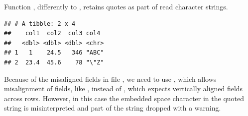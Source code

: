 \documentclass[krantz2]{krantz}\usepackage{knitr}
\begin{document}
Function , differently to , retains quotes as part of read character strings.

\begin{knitrout}\footnotesize
{}\color{fgcolor}\begin{kframe}
\begin{alltt}
\hlstd{(} \hlstd{=} \hlstd{)}
\end{alltt}


{\ttfamily\noindent\itshape\color{messagecolor}{\#\# \\\#\# -- Column specification --------------------------------------------------------\\\#\# cols(\\\#\# \ \ col1 = col\_double(),\\\#\# \ \ col2 = col\_double(),\\\#\# \ \ col3 = col\_double(),\\\#\# \ \ col4 = col\_character()\\\#\# )}}

{\ttfamily\noindent\color{warningcolor}{\#\# Warning: 1 parsing failure.\\\#\# row col \ expected \ \ \ actual \ \ \ \ \ \ \ \ \ \ \ \ \ \ \ \ \ \ \ \ \ \ \ file\\\#\# \ \ 2 \ -- 4 columns 5 columns 'extdata/aligned-ASCII.txt'}}\begin{verbatim}
## # A tibble: 2 x 4
##    col1  col2  col3 col4 
##   <dbl> <dbl> <dbl> <chr>
## 1   1    24.5   346 "ABC"
## 2  23.4  45.6    78 "\"Z"
\end{verbatim}
\end{kframe}
\end{knitrout}

Because of the misaligned fields in file , we need to use , which allows misalignment of fields, like , instead of , which expects vertically aligned fields across rows. However, in this case the embedded space character in the quoted string is misinterpreted and part of the string dropped with a warning.
\end{document}
